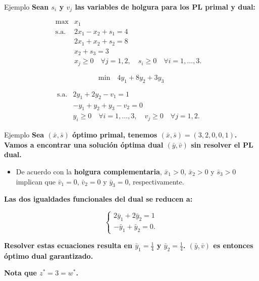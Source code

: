 \documentclass{beamer}
\begin{document}
\begin{frame}{Ejemplo}
    \textbf{Sean \( s_i \) y \( v_j \) las variables de holgura para los PL primal y dual:}

    \[
    \begin{array}{lll}
    \text{max} & x_1 & \\
    \text{s.a.} & 2x_1 - x_2 + s_1 = 4 & \\
    & 2x_1 + x_2 + s_2 = 8 & \\
    & x_2 + s_3 = 3 & \\
    & x_j \geq 0 \quad \forall j = 1, 2, \quad s_i \geq 0 \quad \forall i = 1, \ldots, 3.
    \end{array}
    \]

    \vspace{0.5cm}
    \[
    \text{min} \quad 4y_1 + 8y_2 + 3y_3
    \]

    \vspace{0.5cm}
    \[
    \begin{array}{lll}
    \text{s.a.} & 2y_1 + 2y_2 - v_1 = 1 & \\
    & -y_1 + y_2 + y_3 - v_2 = 0 & \\
    & y_i \geq 0 \quad \forall i = 1, \ldots, 3, \quad v_j \geq 0 \quad \forall j = 1, 2.
    \end{array}
    \]
\end{frame}

\begin{frame}{Ejemplo}
    \textbf{Sea \((\bar{x}, \bar{s})\) óptimo primal, tenemos \((\bar{x}, \bar{s}) = (3, 2, 0, 0, 1)\). Vamos a encontrar una solución óptima dual \((\bar{y}, \bar{v})\) sin resolver el PL dual.}

    \vspace{0.5cm}
    \begin{itemize}
        \item De acuerdo con la \textbf{holgura complementaria}, \(\bar{x}_1 > 0\), \(\bar{x}_2 > 0\) y \(\bar{s}_3 > 0\) implican que \(\bar{v}_1 = 0\), \(\bar{v}_2 = 0\) y \(\bar{y}_3 = 0\), respectivamente.
    \end{itemize}

    \vspace{0.5cm}
    \textbf{Las dos igualdades funcionales del dual se reducen a:}

    \[
    \begin{cases}
    2\bar{y}_1 + 2\bar{y}_2 = 1 \\
    -\bar{y}_1 + \bar{y}_2 = 0.
    \end{cases}
    \]

    \vspace{0.5cm}
    \textbf{Resolver estas ecuaciones resulta en \(\bar{y}_1 = \frac{1}{4}\) y \(\bar{y}_2 = \frac{1}{4}\). \((\bar{y}, \bar{v})\) es entonces óptimo dual garantizado.}

    \vspace{0.5cm}
    \textbf{Nota que \( z^* = 3 = w^* \).}
\end{frame}
\end{document}
